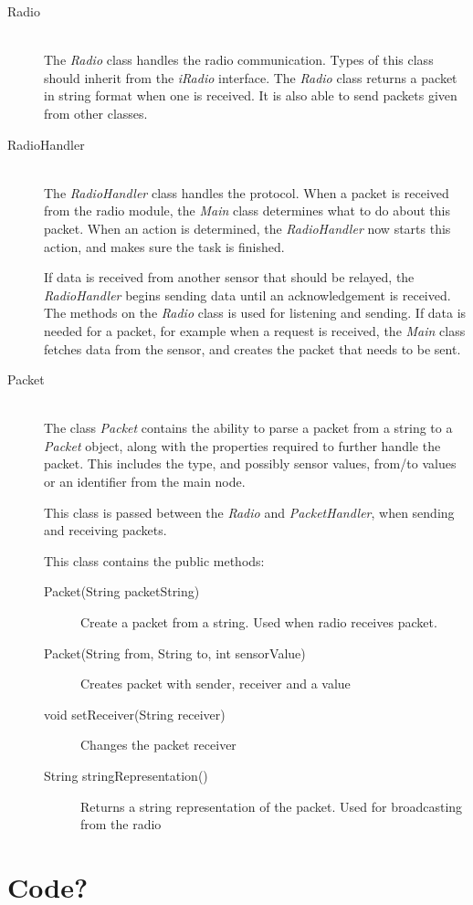 \begin{description}
\item[Radio] \hfill \\
The \textit{Radio} class handles the radio communication. Types of this class should inherit from the \textit{iRadio} interface. The \textit{Radio} class returns a packet in string format when one is received. It is also able to send packets given from other classes.

\item[RadioHandler] \hfill \\
The \textit{RadioHandler} class handles the protocol. When a packet is received from the radio module, the \textit{Main} class determines what to do about this packet. When an action is determined, the \textit{RadioHandler} now starts this action, and makes sure the task is finished. 

If data is received from another sensor that should be relayed, the \textit{RadioHandler} begins sending data until an acknowledgement is received. The methods on the \textit{Radio} class is used for listening and sending.
If data is needed for a packet, for example when a request is received, the \textit{Main} class fetches data from the sensor, and creates the packet that needs to be sent. 

\item[Packet] \hfill \\
The class \textit{Packet} contains the ability to parse a packet from a string to a \textit{Packet} object, along with the properties required to further handle the packet. This includes the type, and possibly sensor values, from/to values or an identifier from the main node.

This class is passed between the \textit{Radio} and \textit{PacketHandler}, when sending and receiving packets.

This class contains the public methods:
\begin{description}
\item[Packet(String packetString)] Create a packet from a string. Used when radio receives packet.
\item[Packet(String from, String to, int sensorValue)] Creates packet with sender, receiver and a value
\item[void setReceiver(String receiver)] Changes the packet receiver
\item[String stringRepresentation()] Returns a string representation of the packet. Used for broadcasting from the radio
\end{description}

\end{description}


\section{Code?}